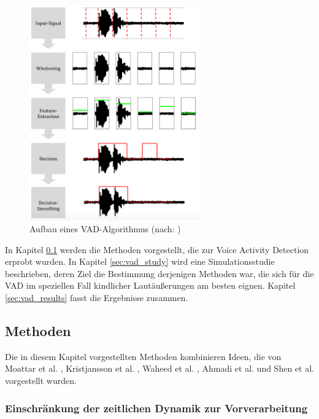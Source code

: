 \begin{figure}[h]
	\centering
	\includegraphics[width=0.65\textwidth]{bilder/vad_pipeline03.png}
	\caption[Aufbau eines VAD-Algorithmus]{Aufbau eines VAD-Algorithmus (nach: \cite[S. 8]{vad_granada})}
	\label{img:vad_pipeline}
\end{figure}


In Kapitel \ref{sec:methods_vad_new} werden die Methoden vorgestellt, die zur Voice Activity Detection erprobt wurden. In Kapitel \ref{sec:vad_study} wird eine Simulationsstudie beschrieben, deren Ziel die Bestimmung derjenigen Methoden war, die sich für die VAD im speziellen Fall kindlicher Lautäußerungen am besten eignen. Kapitel \ref{sec:vad_results} fasst die Ergebnisse zusammen.

\subsection{Methoden}
\label{sec:methods_vad_new}

Die in diesem Kapitel vorgestellten Methoden kombinieren Ideen, die von Moattar et al. \cite{vad_Easy}, Kristjansson et al. \cite{vad_Lisboa}, Waheed et al. \cite{vad_entropy}, Ahmadi et al. \cite{vad_ceps} und Shen et al.\cite{vad_entropie02} vorgestellt wurden.

\subsubsection{Einschränkung der zeitlichen Dynamik zur Vorverarbeitung}
\label{sec:preprocessing}

